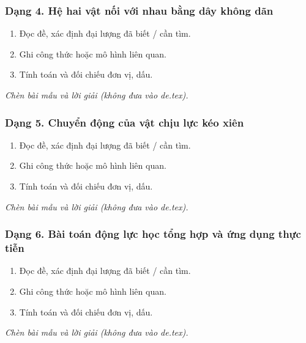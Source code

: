 \subsubsection{Dạng 4. Hệ hai vật nối với nhau bằng dây không dãn}
\begin{phuongphap}
\begin{enumerate}
\item Đọc đề, xác định đại lượng đã biết / cần tìm.
\item Ghi công thức hoặc mô hình liên quan.
\item Tính toán và đối chiếu đơn vị, dấu.
\end{enumerate}
\end{phuongphap}
\begin{vidumau}
\textit{Chèn bài mẫu và lời giải (không đưa vào de.tex).}
\end{vidumau}

\subsubsection{Dạng 5. Chuyển động của vật chịu lực kéo xiên}
\begin{phuongphap}
\begin{enumerate}
\item Đọc đề, xác định đại lượng đã biết / cần tìm.
\item Ghi công thức hoặc mô hình liên quan.
\item Tính toán và đối chiếu đơn vị, dấu.
\end{enumerate}
\end{phuongphap}
\begin{vidumau}
\textit{Chèn bài mẫu và lời giải (không đưa vào de.tex).}
\end{vidumau}

\subsubsection{Dạng 6. Bài toán động lực học tổng hợp và ứng dụng thực tiễn}
\begin{phuongphap}
\begin{enumerate}
\item Đọc đề, xác định đại lượng đã biết / cần tìm.
\item Ghi công thức hoặc mô hình liên quan.
\item Tính toán và đối chiếu đơn vị, dấu.
\end{enumerate}
\end{phuongphap}
\begin{vidumau}
\textit{Chèn bài mẫu và lời giải (không đưa vào de.tex).}
\end{vidumau}

